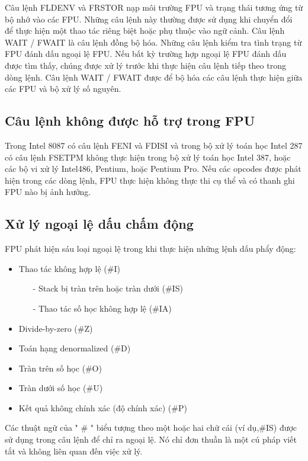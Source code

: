		Câu lệnh FLDENV và FRSTOR nạp môi trường FPU và trạng thái tương ứng từ bộ nhớ vào các FPU. Những câu lệnh này thường được sử dụng khi chuyển đổi để thực hiện một thao tác riêng biệt hoặc phụ thuộc vào ngữ cảnh. Câu lệnh WAIT / FWAIT là câu lệnh đồng bộ hóa. Những câu lệnh kiểm tra tình trạng từ FPU đánh dấu ngoại lệ FPU. Nếu bất kỳ trường hợp ngoại lệ FPU đánh dấu được tìm thấy, chúng được xử lý trước khi thực hiện câu lệnh tiếp theo trong dòng lệnh. Câu lệnh WAIT / FWAIT được để bộ hóa các câu lệnh thực hiện giữa các FPU và bộ xử lý số nguyên. 
		
		\subsection*{ Câu lệnh không được hỗ trợ trong FPU}
		Trong Intel 8087 có câu lệnh FENI và FDISI và trong bộ xử lý toán học Intel 287 có câu lệnh FSETPM không thực hiện trong bộ xử lý toán học Intel 387, hoặc các bộ vi xử lý Intel486, Pentium, hoặc Pentium Pro. Nếu các opcodes được phát hiện trong các dòng lệnh, FPU thực hiện không thực thi cụ thể và có thanh ghi FPU nào bị ảnh hưởng.

		\subsection{Xử lý ngoại lệ dấu chấm động}
		FPU phát hiện sáu loại ngoại lệ trong khi thực hiện những lệnh dấu phẩy động:
		\begin{itemize}
			\renewcommand{\labelitemi}{\textbullet}
			\item Thao tác không hợp lệ (\#I)
				\begin{itemize}
					\item[-] Stack bị tràn trên hoặc tràn dưới (\#IS)
					\item[-] Thao tác số học không hợp lệ (\#IA)
				\end{itemize}
			\item Divide-by-zero (\#Z)			
			\item  Toán hạng denormalized (\#D)
			\item  Tràn trên số học (\#O)
			\item Tràn dưới số học (\#U)
			\item  Kết quả không chính xác (độ chính xác) (\#P)			
		\end{itemize}

Các thuật ngữ của " \# " biểu tượng theo một hoặc hai chữ cái (ví dụ,\#IS) được sử dụng trong câu lệnh để chỉ ra ngoại lệ. Nó chỉ đơn thuần là một cú pháp viết tắt và không liên quan đến việc xử lý.

